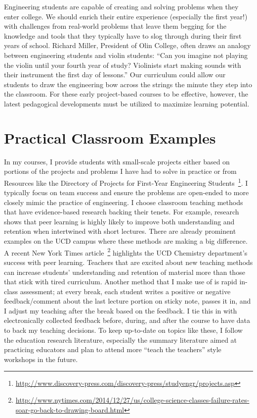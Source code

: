 \documentclass{article}
\begin{document}
Engineering students are capable of creating and solving problems when they
enter college. We should enrich their entire experience (especially the first
year!) with challenges from real-world problems that leave them begging for the
knowledge and tools that they typically have to slog through during their first
years of school. Richard Miller, President of Olin College, often draws an
analogy between engineering students and violin students: ``Can you imagine not
playing the violin until your fourth year of study? Violinists start making
sounds with their instrument the first day of lessons.'' Our curriculum could
allow our students to draw the engineering bow across the strings the minute
they step into the classroom. For these early project-based courses to be
effective, however, the latest pedagogical developments must be utilized to
maximize learning potential.

\section*{Practical Classroom Examples}
%
In my courses, I provide students with small-scale projects either based on
portions of the projects and problems I have had to solve in practice or from
Resources like the Directory of Projects for First-Year Engineering
Students~\footnote{\url{http://www.discovery-press.com/discovery-press/studyengr/projects.asp}}.
I typically focus on team success and ensure the problems are open-ended to
more closely mimic the practice of engineering. I choose classroom teaching
methods that have evidence-based research backing their tenets. For example,
research shows that peer learning is highly likely to improve both
understanding and retention when intertwined with short lectures. There are
already prominent examples on the UCD campus where these methods are making a
big difference. A recent New York Times
article~\footnote{\url{http://www.nytimes.com/2014/12/27/us/college-science-classes-failure-rates-soar-go-back-to-drawing-board.html}}
highlights the UCD Chemistry department's success with peer learning. Teachers
that are excited about new teaching methods can increase students'
understanding and retention of material more than those that stick with tired
curriculum. Another method that I make use of is rapid in-class assessment; at
every break, each student writes a positive or negative feedback/comment about
the last lecture portion on sticky note, passes it in, and I adjust my teaching
after the break based on the feedback. I tie this in with electronically
collected feedback before, during, and after the course to have data to back my
teaching decisions. To keep up-to-date on topics like these, I follow the
education research literature, especially the summary literature aimed at
practicing educators and plan to attend more ``teach the teachers'' style
workshops in the future.
\end{document}
